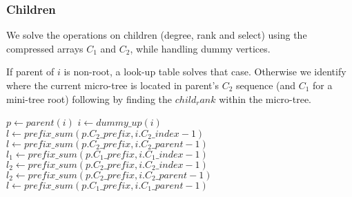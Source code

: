\subsubsection{Children}

We solve the operations on children (degree, rank and select) using the compressed arrays $C_1$ and $C_2$, while handling dummy vertices.

\begin{algorithmic}
		\State {}
		\State {}
	\Else
		\State {}
	\EndIf
\EndFunction
\end{algorithmic}

If parent of $i$ is non-root, a look-up table solves that case.
Otherwise we identify where the current micro-tree is located in parent's $C_2$ sequence (and $C_1$ for a mini-tree root) following by finding the $child_rank$ within the micro-tree.

\begin{algorithmic}
	\State $p \gets parent(i)$
	\State $i \gets dummy\_up(i)$
		\State {}
		 
			\State $l \gets prefix\_sum(p.C_2\_prefix, i.C_2\_index - 1)$
			\State {}
		\Else {}
			\State $l \gets prefix\_sum(p.C_2\_prefix, i.C_2\_parent - 1)$
			\State {}
		\EndIf
		 
			\State $l_1 \gets prefix\_sum(p.C_1\_prefix, i.C_1\_index - 1)$
			 
				\State $l_2 \gets prefix\_sum(p.C_2\_prefix, i.C_2\_index - 1)$
				\State {}
			\Else {}
				\State $l_2 \gets prefix\_sum(p.C_2\_prefix, i.C_2\_parent - 1)$
				\State {}
			\EndIf
		\Else {}
			\State $l \gets prefix\_sum(p.C_1\_prefix, i.C_1\_parent - 1)$
			\State {}
		\EndIf
	\Else
		\State {}
	\EndIf
\EndFunction
\end{algorithmic}

